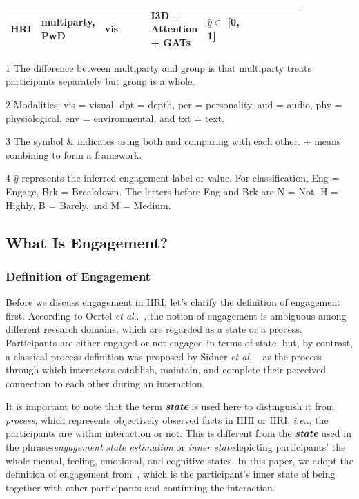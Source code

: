 \documentclass[10pt,journal,compsoc]{IEEEtran}
\makeatletter
\DeclareRobustCommand\onedot{\futurelet\@let@token\@onedot}
\def\@onedot{\ifx\@let@token.\else.\null\fi\xspace}
\def\ie{\emph{i.e}\onedot} \def\Ie{\emph{I.e}\onedot}
\def\etal{\emph{et al}\onedot}
\makeatother
\begin{document}
\begin{table}[t]
\begin{threeparttable}[b]
\begin{tabular}{p{0.04\linewidth}p{0.08\linewidth}p{0.18\linewidth}p{0.15\linewidth}p{0.18\linewidth}p{0.22\linewidth}}
  HRI &
  multiparty, PwD &
  vis &
  I3D + Attention + GATs &
  $\hat{y} \in$ [0, 1] \\
  \bottomrule
  \end{tabular}
  \begin{tablenotes}
    \item [1] The difference between multiparty and group is that multiparty treats participants separately but group is a whole.
    \item [2] Modalities: vis = visual, dpt = depth, per = personality, aud = audio, phy = physiological, env = environmental, and txt = text.
    \item [3] The symbol \& indicates using both and comparing with each other. + means combining to form a framework.
    \item [4] $\hat{y}$ represents the inferred engagement label or value. For classification, Eng = Engage, Brk = Breakdown. The letters before Eng and Brk are N = Not, H = Highly, B = Barely, and M = Medium.
  \end{tablenotes}
 \end{threeparttable}
\end{table}

\subsection{What Is Engagement?}
\label{subs:What_Is_Engagement}

\subsubsection{Definition of Engagement}

Before we discuss engagement in HRI, let's clarify the definition of engagement first. According to Oertel \etal~\cite{Oertel2020Engagement}, the notion of engagement is ambiguous among different research domains, which are regarded as a state or a process. Participants are either engaged or not engaged in terms of state, but, by contrast, a classical process definition was proposed by Sidner \etal~\cite{Sidner2005Explorations} as the process through which interactors establish, maintain, and complete their perceived connection to each other during an interaction.

It is important to note that the term \textbf{\textit{state}} is used here to distinguish it from \textit{process}, which represents objectively observed facts in HHI or HRI, \ie, the participants are within interaction or not. This is different from the \textbf{\textit{state}} used in the phrases\textemdash \textit{engagement state estimation} or \textit{inner state}\textemdash depicting participants' the whole mental, feeling, emotional, and cognitive states. In this paper, we adopt the definition of engagement from~\cite{Poggi2013Mind}, which is the participant's inner state of being together with other participants and continuing the interaction.
\end{document}
